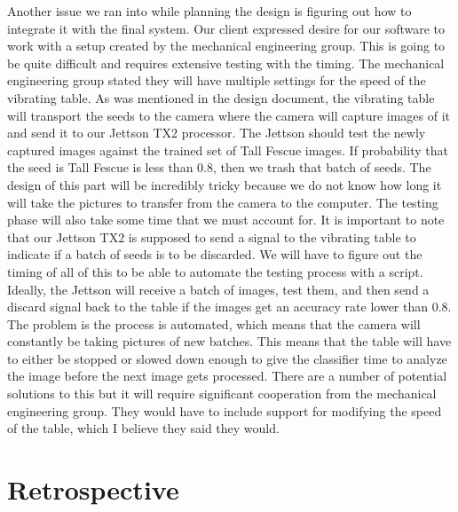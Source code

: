 \documentclass[onecolumn, draftclsnofoot,10pt, compsoc]{IEEEtran}
\begin{document}
	Another issue we ran into while planning the design is figuring out how to integrate it with the final system. Our client expressed desire for our software to work with a setup created by the mechanical engineering group. This is going to be quite difficult and requires extensive testing with the timing. The mechanical engineering group stated they will have multiple settings for the speed of the vibrating table. As was mentioned in the design document, the vibrating table will transport the seeds to the camera where the camera will capture images of it and send it to our Jettson TX2 processor. The Jettson should test the newly captured images against the trained set of Tall Fescue images. If probability that the seed is Tall Fescue is less than 0.8, then we trash that batch of seeds. The design of this part will be incredibly tricky because we do not know how long it will take the pictures to transfer from the camera to the computer. The testing phase will also take some time that we must account for. It is important to note that our Jettson TX2 is supposed to send a signal to the vibrating table to indicate if a batch of seeds is to be discarded. We will have to figure out the timing of all of this to be able to automate the testing process with a script. Ideally, the Jettson will receive a batch of images, test them, and then send a discard signal back to the table if the images get an accuracy rate lower than 0.8. The problem is the process is automated, which means that the camera will constantly be taking pictures of new batches. This means that the table will have to either be stopped or slowed down enough to give the classifier time to analyze the image before the next image gets processed. There are a number of potential solutions to this but it will require significant cooperation from the mechanical engineering group. They would have to include support for modifying the speed of the table, which I believe they said they would.
	
	\section{Retrospective}
	
\end{document}
